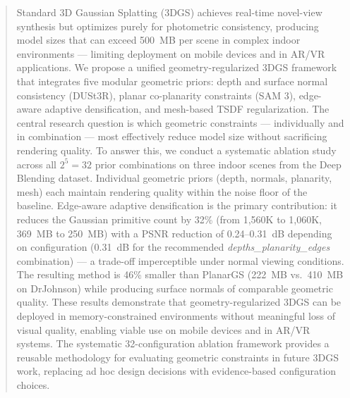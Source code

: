 \documentclass[
11pt, %
oneside, %
ukrainian,
english, %
singlespacing, %
headsepline, %
]{BachelorMasterThesis} %
\begin{document}

\begin{abstract}
\addchaptertocentry{\abstractname}

\noindent Standard 3D Gaussian Splatting (3DGS) achieves real-time novel-view synthesis but optimizes purely for photometric consistency, producing model sizes that can exceed 500~MB per scene in complex indoor environments — limiting deployment on mobile devices and in AR/VR applications. We propose a unified geometry-regularized 3DGS framework that integrates five modular geometric priors: depth and surface normal consistency (DUSt3R), planar co-planarity constraints (SAM 3), edge-aware adaptive densification, and mesh-based TSDF regularization. The central research question is which geometric constraints — individually and in combination — most effectively reduce model size without sacrificing rendering quality. To answer this, we conduct a systematic ablation study across all $2^5 = 32$ prior combinations on three indoor scenes from the Deep Blending dataset. Individual geometric priors (depth, normals, planarity, mesh) each maintain rendering quality within the noise floor of the baseline. Edge-aware adaptive densification is the primary contribution: it reduces the Gaussian primitive count by 32\% (from 1{,}560K to 1{,}060K, 369~MB to 250~MB) with a PSNR reduction of 0.24--0.31~dB depending on configuration (0.31~dB for the recommended \textit{depths\_planarity\_edges} combination) — a trade-off imperceptible under normal viewing conditions. The resulting method is 46\% smaller than PlanarGS (222~MB vs.\ 410~MB on DrJohnson) while producing surface normals of comparable geometric quality. These results demonstrate that geometry-regularized 3DGS can be deployed in memory-constrained environments without meaningful loss of visual quality, enabling viable use on mobile devices and in AR/VR systems. The systematic 32-configuration ablation framework provides a reusable methodology for evaluating geometric constraints in future 3DGS work, replacing ad hoc design decisions with evidence-based configuration choices.
\end{abstract}


\end{document}
